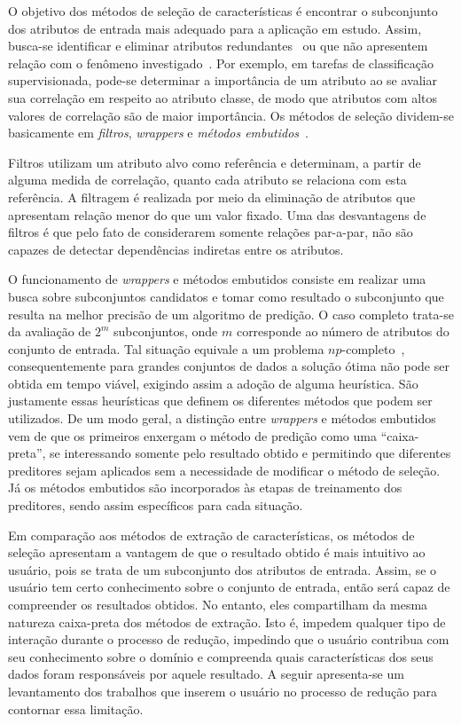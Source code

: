 O objetivo dos métodos de seleção de características é
encontrar o subconjunto  dos atributos de entrada mais
adequado para a aplicação em estudo. Assim, busca-se
identificar e eliminar atributos
redundantes~\cite{Kohavi1997} ou que não apresentem relação
com o fenômeno investigado~\cite{Nilsson2007}.  Por exemplo,
em tarefas de classificação supervisionada, pode-se
determinar a importância de um atributo ao se avaliar sua
correlação em respeito ao atributo classe, de modo que
atributos com altos valores de correlação são de maior
importância. Os métodos de seleção dividem-se basicamente
em \emph{filtros}, \emph{wrappers} e \emph{métodos
embutidos}~\cite{Guyon2003}. 

Filtros utilizam um atributo alvo como referência e
determinam, a partir de alguma medida de correlação, quanto
cada atributo se relaciona com esta referência. A filtragem
é realizada por meio da eliminação de atributos que apresentam relação
menor do que um valor fixado. Uma das desvantagens de
filtros é que pelo fato de considerarem somente relações
par-a-par, não são capazes de detectar dependências
indiretas entre os atributos. 

O funcionamento de \emph{wrappers} e métodos embutidos
consiste em realizar uma busca sobre subconjuntos candidatos
e tomar como resultado o subconjunto que resulta na melhor
precisão de um algoritmo de predição. O caso completo
trata-se da avaliação de $2^m$ subconjuntos, onde $m$
corresponde ao número de atributos do conjunto de entrada.
Tal situação equivale a um problema
$np$-completo~\cite{Amaldi1998}, consequentemente para
grandes conjuntos de dados a solução ótima não pode ser
obtida em tempo viável, exigindo assim a adoção de alguma
heurística. São justamente essas heurísticas que definem os
diferentes métodos que podem ser utilizados. De um modo
geral, a distinção entre \emph{wrappers} e métodos embutidos
vem de que os primeiros enxergam o método de predição como
uma ``caixa-preta'', se interessando somente pelo resultado
obtido e permitindo que diferentes preditores sejam
aplicados sem a necessidade de modificar o método de
seleção. Já os métodos embutidos são incorporados às etapas
de treinamento dos preditores, sendo assim específicos para
cada situação. 

Em comparação aos métodos de extração de características,
os métodos de seleção apresentam a vantagem de que o
resultado obtido é mais intuitivo ao usuário, pois se trata
de um subconjunto dos atributos de entrada. Assim, se o
usuário tem certo conhecimento sobre o conjunto de entrada,
então será capaz de compreender os resultados obtidos. No
entanto, eles compartilham da mesma natureza caixa-preta dos
métodos de extração. Isto é, impedem qualquer tipo de 
interação durante o processo de redução, impedindo que o
usuário contribua com seu conhecimento sobre o domínio e
compreenda quais características dos seus dados foram
responsáveis por aquele resultado. A seguir apresenta-se um
levantamento dos trabalhos que inserem o usuário no
processo de redução para contornar essa limitação.


